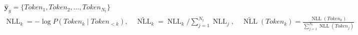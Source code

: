 ﻿\documentclass{article}
\begin{document}
\begin{preview}
\(\displaystyle
\begin{gathered}
  \hat{\bm y}_g
  =\{\mathit{Token}_1,\mathit{Token}_2,\dots,\mathit{Token}_{N_t}\} \\
  \operatorname{NLL}_k
  = -\log P(\mathit{Token}_k\mid \mathit{Token}_{<k}), \quad
  \tilde{\operatorname{NLL}}_k
  =
  \operatorname{NLL}_k\Big/
  \sum_{j=1}^{N_t}\operatorname{NLL}_j, \quad
  \widetilde{\operatorname{NLL}}(\mathit{Token}_k)
  =
  \frac{\operatorname{NLL}(\mathit{Token}_k)}
  {\sum_{j=1}^{N_t}\operatorname{NLL}(\mathit{Token}_j)} 
\end{gathered}
\)
\end{preview}
\end{document}

